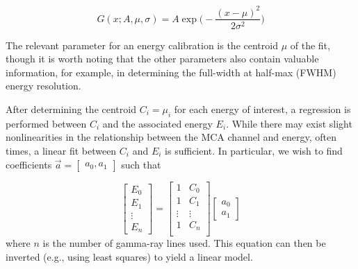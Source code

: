 \begin{equation}
G(x; A, \mu, \sigma) = A\exp\bigg(-\frac{(x-\mu)^2}{2\sigma^2}\bigg)
\end{equation}

The relevant parameter for an energy calibration is the centroid $\mu$ of the fit,
though it is worth noting that the other parameters also contain valuable information,
for example, in determining the full-width at half-max (FWHM) energy resolution.

After determining the centroid $C_i = \mu_i$ for each energy of interest, a
regression is performed between $C_i$ and the associated energy $E_i$. While there
may exist slight nonlinearities in the relationship between the MCA channel and
energy, often times, a linear fit between $C_i$ and $E_i$ is sufficient.
In particular, we wish to find coefficients
$\vec{a} = \begin{bmatrix}a_0, a_1 \end{bmatrix}$ such that

\begin{equation}
    \begin{bmatrix}
        E_0 \\ E_1 \\ \vdots \\ E_n
    \end{bmatrix} =
    \begin{bmatrix}
        1 & C_0 \\
        1 & C_1 \\
        \vdots & \vdots \\
        1 & C_n \\
    \end{bmatrix}
    \begin{bmatrix}
        a_0 \\ a_1
    \end{bmatrix}
\end{equation}
where $n$ is the number of gamma-ray lines used. This equation can then be
inverted (e.g., using least squares) to yield a linear model.
